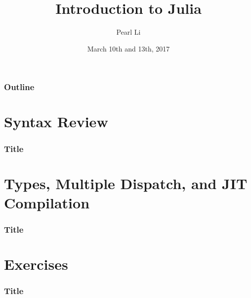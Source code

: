\documentclass{beamer}
\begin{document}
\title{Introduction to Julia}
\author{Pearl Li}
\date{March 10th and 13th, 2017}

\begin{frame}
\titlepage
\end{frame}

\begin{frame}
\frametitle{Outline}
\tableofcontents
\end{frame}

\section{Syntax Review}

\begin{frame}
  \frametitle{Title}
\end{frame}


\section{Types, Multiple Dispatch, and JIT Compilation}

\begin{frame}
  \frametitle{Title}
\end{frame}


\section{Exercises}

\begin{frame}
  \frametitle{Title}
\end{frame}
\end{document}
